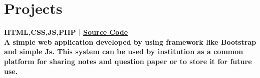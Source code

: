 \documentclass[]{deedy-resume-openfont}
\begin{document}
\begin{minipage}[t]{0.66\textwidth}




\section{Projects}
\textbf{HTML,CSS,JS,PHP | } \textbf{\href{https://github.com/Pankajcoder1/Notes}{Source Code}} \\  
\textbf{A simple web application developed by using framework like Bootstrap and simple Js. This system can be used by institution as a common platform for sharing notes and question paper or to store it for future use.}
\sectionsep


\end{minipage}
\end{document}
